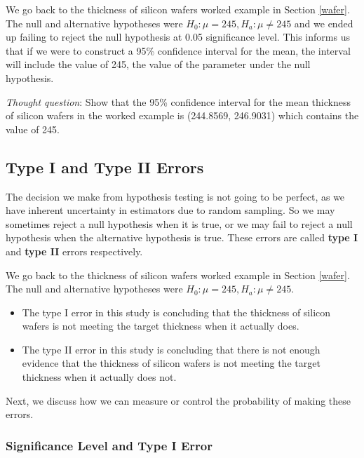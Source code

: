 \documentclass[
]{book}
\begin{document}
We go back to the thickness of silicon wafers worked example in Section \ref{wafer}. The null and alternative hypotheses were \(H_0: \mu = 245, H_a: \mu \neq 245\) and we ended up failing to reject the null hypothesis at 0.05 significance level. This informs us that if we were to construct a 95\% confidence interval for the mean, the interval will include the value of 245, the value of the parameter under the null hypothesis.

\emph{Thought question}: Show that the 95\% confidence interval for the mean thickness of silicon wafers in the worked example is (244.8569, 246.9031) which contains the value of 245.

\hypertarget{type-i-and-type-ii-errors}{%
\subsection{Type I and Type II Errors}\label{type-i-and-type-ii-errors}}

The decision we make from hypothesis testing is not going to be perfect, as we have inherent uncertainty in estimators due to random sampling. So we may sometimes reject a null hypothesis when it is true, or we may fail to reject a null hypothesis when the alternative hypothesis is true. These errors are called \textbf{type I} and \textbf{type II} errors respectively.

We go back to the thickness of silicon wafers worked example in Section \ref{wafer}. The null and alternative hypotheses were \(H_0: \mu = 245, H_a: \mu \neq 245\).

\begin{itemize}
\item
  The type I error in this study is concluding that the thickness of silicon wafers is not meeting the target thickness when it actually does.
\item
  The type II error in this study is concluding that there is not enough evidence that the thickness of silicon wafers is not meeting the target thickness when it actually does not.
\end{itemize}

Next, we discuss how we can measure or control the probability of making these errors.

\hypertarget{significance-level-and-type-i-error}{%
\subsubsection{Significance Level and Type I Error}\label{significance-level-and-type-i-error}}
\end{document}
